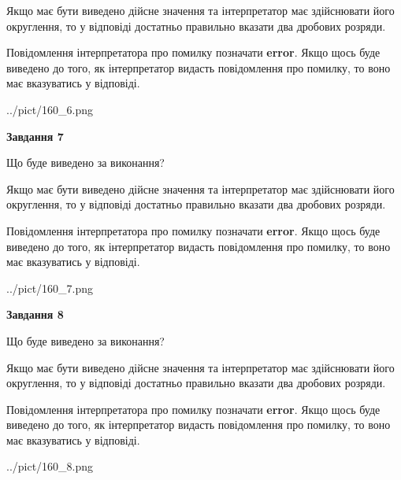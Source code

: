\documentclass[12pt, ukrainian]{article}
\begin{document}
{\begin {Large}
Якщо має бути виведено дійсне значення та інтерпретатор має здійснювати його округлення, 
то у відповіді достатньо правильно вказати два дробових розряди.

Повідомлення інтерпретатора про помилку позначати \textbf{error}.
Якщо щось буде виведено до того, як інтерпретатор видасть повідомлення про помилку, 
то воно має вказуватись у відповіді. \par

\begin{center}
	{../pict/160_6.png}
\end{center}
\newpage

{\begin {center}\textbf{Завдання 7}\end {center}}\par
Що буде виведено за виконання? \par

Якщо має бути виведено дійсне значення та інтерпретатор має здійснювати його округлення, 
то у відповіді достатньо правильно вказати два дробових розряди.

Повідомлення інтерпретатора про помилку позначати \textbf{error}.
Якщо щось буде виведено до того, як інтерпретатор видасть повідомлення про помилку, 
то воно має вказуватись у відповіді. \par

\begin{center}
	{../pict/160_7.png}
\end{center}
\newpage

{\begin {center}\textbf{Завдання 8}\end {center}}\par
Що буде виведено за виконання? \par

Якщо має бути виведено дійсне значення та інтерпретатор має здійснювати його округлення, 
то у відповіді достатньо правильно вказати два дробових розряди.

Повідомлення інтерпретатора про помилку позначати \textbf{error}.
Якщо щось буде виведено до того, як інтерпретатор видасть повідомлення про помилку, 
то воно має вказуватись у відповіді. \par

\begin{center}
	{../pict/160_8.png}
\end{center}
\newpage


\end{Large}}
\end{document}

